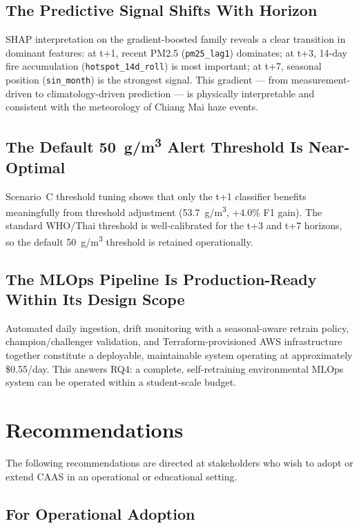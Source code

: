 \subsection{The Predictive Signal Shifts With Horizon}

SHAP interpretation on the gradient-boosted family reveals a clear
transition in dominant features: at t+1, recent PM2.5 (\texttt{pm25\_lag1})
dominates; at t+3, 14-day fire accumulation
(\texttt{hotspot\_14d\_roll}) is most important; at t+7, seasonal
position (\texttt{sin\_month}) is the strongest signal. This gradient
--- from measurement-driven to climatology-driven prediction --- is
physically interpretable and consistent with the meteorology of Chiang
Mai haze events.

\subsection{The Default 50~\textmu g/m\textsuperscript{3} Alert Threshold Is Near-Optimal}

Scenario~C threshold tuning shows that only the t+1 classifier benefits
meaningfully from threshold adjustment (53.7~\textmu g/m\textsuperscript{3},
+4.0\% F1 gain). The standard WHO/Thai threshold is well-calibrated for
the t+3 and t+7 horizons, so the default 50~\textmu g/m\textsuperscript{3}
threshold is retained operationally.

\subsection{The MLOps Pipeline Is Production-Ready Within Its Design Scope}

Automated daily ingestion, drift monitoring with a seasonal-aware
retrain policy, champion/challenger validation, and Terraform-provisioned
AWS infrastructure together constitute a deployable, maintainable
system operating at approximately \$0.55/day. This answers RQ4:
a complete, self-retraining environmental MLOps system can be operated
within a student-scale budget.

\section{Recommendations}

The following recommendations are directed at stakeholders who wish to
adopt or extend CAAS in an operational or educational setting.

\subsection{For Operational Adoption}

